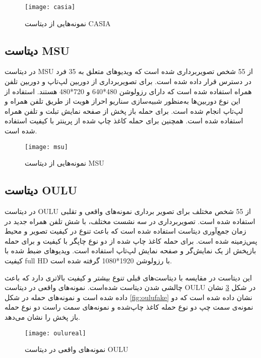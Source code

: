  \begin{figure}[h]
	\centerline{\texttt{[image: casia]}}
	\caption{نمونه‌هایی از دیتاست CASIA \cite{zhang2012face} }
	\label{fig:casia}
\end{figure}

\subsection{دیتاست MSU}
در دیتاست MSU
\cite{wen2015face}
 از 55 شخص تصویربرداری شده است که ویدیوهای متعلق به 35 فرد در دسترس قرار داده شده است. برای تصویربرداری از دوربین لپ‌تاپ و دوربین تلفن همراه استفاده شده است که دارای رزولوشن 480*640 و 720*480 هستند. استفاده از این نوع دوربین‌ها به‌منظور شبیه‌سازی سناریو احراز هویت از طریق تلفن همراه و لپ‌تاپ انجام شده است. برای حمله باز پخش از صفحه نمایش تبلت و تلفن همراه استفاده شده است. همچنین برای حمله کاغذ چاپ شده از پرینتر با کیفیت استفاده شده است.

 \begin{figure}[h]
	\centerline{\texttt{[image: msu]}}
	\caption{نمونه‌هایی از دیتاست MSU \cite{wen2015face} }
	\label{fig:msu}
\end{figure}

\subsection{دیتاست OULU}
در دیتاست OULU
\cite{boulkenafet2017oulu}
از 55 شخص مختلف برای تصویر برداری نمونه‌های واقعی و تقلبی استفاده شده است. تصویربرداری در سه نشست مختلف، با شش تلفن همراه جدید در زمان جمع‌آوری دیتاست استفاده شده است که باعث تنوع در کیفیت تصویر و محیط پس‌زمینه شده است. برای حمله کاغذ چاپ شده از دو نوع چاپگر با کیفیت و برای حمله بازپخش از یک نمایش‌گر و صفحه نمایش لپ‌تاپ استفاده است. ویدیوهای ضبط شده با کیفیت full HD با رزولوشن 1920*1080 گرفته شده است.

این دیتاست در مقایسه با دیتاست‌های قبلی تنوع بیشتر و کیفیت بالاتری دارد که باعث چالشی شدن دیتاست شده‌است. نمونه‌های واقعی در دیتاست OULU در شکل 
\ref{fig:oulureal}
 نشان داده شده است و نمونه‌های حمله در شکل 
 \ref{fig:oulufake}
 نشان داده شده است که دو نمونه‌ی سمت چپ دو نوع حمله کاغذ چاپ‌شده و نمونه‌های سمت راست دو نوع حمله باز پخش را نشان می‌دهد. 
 
  \begin{figure}[h]
 	\centerline{\texttt{[image: oulureal]}}
 	\caption{نمونه‌های واقعی در دیتاست OULU \cite{boulkenafet2017oulu} }
 	\label{fig:oulureal}
 \end{figure}
 

